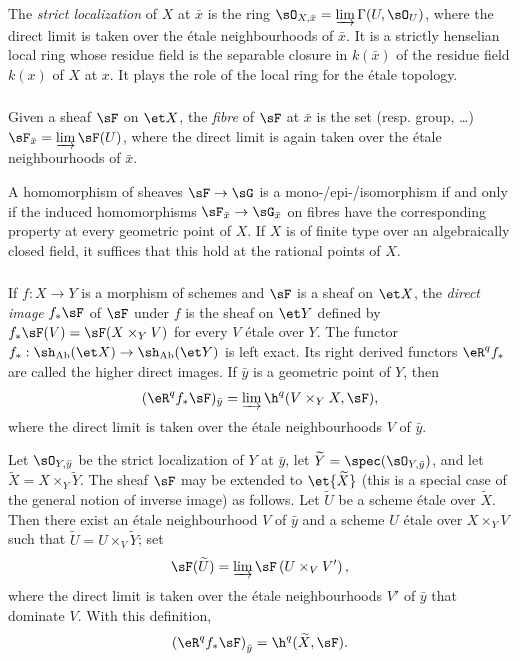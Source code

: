 The \emph{strict localization} of $X$ at $\bar x$ is the ring
$\sO_{X,\bar x}=\varinjlim\Gamma(U,\sO_U)$, where the direct limit is
taken over the étale neighbourhoods of $\bar x$. It is a strictly henselian
local ring whose residue field is the separable closure in $k(\bar x)$
of the residue field $k(x)$ of $X$ at $x$. It plays the role of the local
ring for the étale topology.

\subsubsection{}\label{I:2-3-2}

Given a sheaf $\sF$ on $\et X$, the \emph{fibre} of $\sF$ at $\bar x$
is the set (resp. group, \dots)
$\sF_{\bar x}=\varinjlim\sF(U)$, where the direct limit is again taken
over the étale neighbourhoods of $\bar x$.

A homomorphism of sheaves $\sF\to\sG$ is a mono-/epi-/isomorphism if and
only if the induced homomorphisms $\sF_{\bar x}\to\sG_{\bar x}$ on fibres
have the corresponding property at every geometric point of $X$. If $X$
is of finite type over an algebraically closed field, it suffices that
this hold at the rational points of $X$.

\subsubsection{}\label{I:2-3-3}

If $f:X\to Y$ is a morphism of schemes and $\sF$ is a sheaf on
$\et X$, the \emph{direct image} $f_*\sF$ of $\sF$ under $f$ is the
sheaf on $\et Y$ defined by
$f_*\sF(V)=\sF(X\times_YV)$ for every $V$ étale over $Y$. The functor
$f_*:\sh_{\mathrm{Ab}}(\et X)\to\sh_{\mathrm{Ab}}(\et Y)$ is left exact. Its right derived functors
$\eR^qf_*$ are called the higher direct images. If $\bar y$ is a
geometric point of $Y$, then
\[
  (\eR^q f_* \sF)_{\bar y} = \varinjlim \h^q(V\times_Y X,\sF)\text{,}
\]
where the direct limit is taken over the étale neighbourhoods $V$ of
$\bar y$.

Let $\sO_{Y,\bar y}$ be the strict localization of $Y$ at $\bar y$,
let $\widetilde Y=\spec(\sO_{Y,\bar y})$, and let
$\widetilde X=X\times_Y\widetilde Y$. The sheaf $\sF$ may be extended
to $\et{\widetilde X}$ (this is a special case of the general notion of
inverse image) as follows. Let $\widetilde U$ be a scheme étale over
$\widetilde X$. Then there exist an étale neighbourhood $V$ of $\bar y$
and a scheme $U$ étale over $X\times_YV$ such that
$\widetilde U=U\times_V\widetilde Y$; set
\[
  \sF(\widetilde U)=\varinjlim \sF\left(U\times_V V'\right)\text{,}
\]
where the direct limit is taken over the étale neighbourhoods $V'$ of
$\bar y$ that dominate $V$. With this definition,
\[
  \left(\eR^q f_* \sF\right)_{\bar y} = \h^q(\widetilde X,\sF)\text{.}
\]

